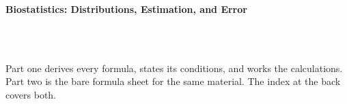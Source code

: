 



\makeindex[title={Index of This Volume},columns=2,intoc]

\begin{titlepage}\thispagestyle{empty}
\vspace*{0.14\textheight}
\noindent{\color{tiercore}\rule{\textwidth}{5pt}}\\[3pt]
\noindent{\color{bioline}\rule{\textwidth}{1pt}}\\[26pt]
\\[12pt]
\noindent\begin{minipage}{\textwidth}\raggedright
{\sffamily\bfseries\fontsize{28}{32}\selectfont\color{bioink}%
 \hyphenchar{} Biostatistics: Distributions, Estimation, and Error\par}\end{minipage}\\[16pt]
\noindent{\color{biogreen}\rule{\textwidth}{1.4pt}}\\[10pt]
\noindent\begin{minipage}{\textwidth}\raggedright
{\fontsize{10.5}{14}\selectfont\color{biogreen}%
Part one derives every formula, states its conditions, and works the calculations. Part two is the
bare formula sheet for the same material. The index at the back covers both.\par}\end{minipage}
\vfill
\noindent{\color{bioline}\rule{\textwidth}{1pt}}\\[3pt]
\noindent{\color{tiercore}\rule{\textwidth}{5pt}}
\end{titlepage}
\tableofcontents
\clearpage
{}
\clearpage
\printindex

